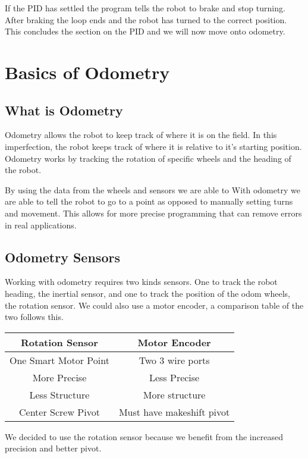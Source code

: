 \documentclass[12pt]{article}
\begin{document}
    If the PID has settled the program tells the robot to brake and stop turning. After braking the loop ends and the robot has turned to the correct position. This concludes the section on the PID and we will now move onto odometry.


\pagebreak
\section{Basics of Odometry}
\subsection{What is Odometry}
    Odometry allows the robot to keep track of where it is on the field. In this imperfection, the robot keeps track of where it is relative to it's starting position. Odometry works by tracking the rotation of specific wheels and the heading of the robot.

    By using the data from the wheels and sensors we are able to
    With odometry we are able to tell the robot to go to a point as opposed to manually setting turns and movement. This allows for more precise programming that can remove errors in real applications.

\subsection{Odometry Sensors}
    Working with odometry requires two kinds sensors. One to track the robot heading, the inertial sensor, and one to track the position of the odom wheels, the rotation sensor. We could also use a motor encoder, a comparison table of the two follows this.
    \begin{center}
        \begin{tabular}{c|c}
            Rotation Sensor & Motor Encoder \\
            \hline
            One Smart Motor Point & Two 3 wire ports \\
            More Precise & Less Precise \\
            Less Structure & More structure \\
            Center Screw Pivot & Must have makeshift pivot \\
        \end{tabular}

        We decided to use the rotation sensor because we benefit from the increased precision and better pivot.
    \end{center}
\end{document}
